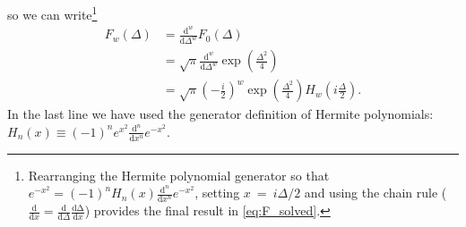 \documentclass[aip, jcp, reprint, onecolumn, nofootinbib]{revtex4-2}
\begin{document}
so we can write\footnote{
	Rearranging the Hermite polynomial generator so that $e^{-x^2} = (-1)^n H_n(x) \frac{\mathrm{d}^n}{\mathrm{d}x^n} e^{-x^2}$, setting $x \ = \ i \Delta /2$ and using the chain rule ($\frac{\mathrm{d}}{\mathrm{d}x} =  \frac{\mathrm{d}}{\mathrm{d}\Delta}  \frac{\mathrm{d\Delta}}{\mathrm{d}x}$) provides the final result in \autoref{eq:F_solved}.
	}
\begin{equation}\label{eq:F_solved}
	\begin{split}
		F_w(\Delta) &= \frac{\mathrm{d}^w}{\mathrm{d}\Delta^w} F_0(\Delta) \\
		&= \sqrt{\pi} \frac{\mathrm{d}^w}{\mathrm{d}\Delta^w} \exp(\frac{\Delta^2}{4}) \\
		&= \sqrt{\pi} \left( -\frac{i}{2} \right)^w \exp(\frac{\Delta^2}{4}) H_w\left(i\frac{\Delta}{2}\right).
	\end{split}
\end{equation}
In the last line we have used the generator definition of Hermite polynomials:  $H_n(x) \equiv (-1)^n e^{x^2} \frac{\mathrm{d}^n}{\mathrm{d}x^n} e^{-x^2}$.\cite{MorseFeshbach}
\vspace{3pt}
\end{document}
